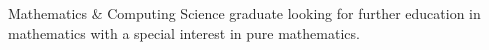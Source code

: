 Mathematics \& Computing Science graduate looking for further education in mathematics
with a special interest in pure mathematics.
